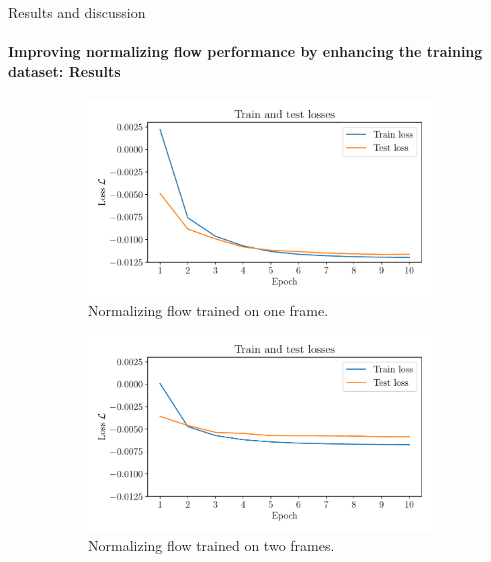 \documentclass{beamer}
\begin{document}
\begin{frame}[allowframebreaks]{Results and discussion}
	\framesubtitle{Improving normalizing flow performance by enhancing the training dataset: Results} %
\begin{figure}[h]
	\centering
	\begin{subfigure}[t]{0.32\textwidth}
		\centering
		\includegraphics[width=\textwidth]{figures/thesis/nf-milne-eddington-example-5-loss-1train-nflows-piecewisequadratic.pdf}
		\caption{Normalizing flow trained on one frame.}
		\label{fig:nf-milne-eddington-example-5-loss-1train-nflows-piecewisequadratic}
	\end{subfigure}
	\hfill
	\begin{subfigure}[t]{0.32\textwidth}
		\centering
		\includegraphics[width=\textwidth]{figures/thesis/nf-milne-eddington-example-5-loss-2train-nflows-piecewisequadratic.pdf}
		\caption{Normalizing flow trained on two frames.}
		\label{fig:nf-milne-eddington-example-5-loss-2train-nflows-piecewisequadratic}
	\end{subfigure}
	\hfill
	\begin{subfigure}[t]{0.32\textwidth}

\end{subfigure}
\end{figure}
\end{frame}
\end{document}
